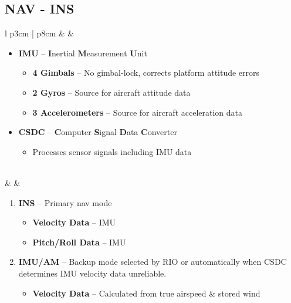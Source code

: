\documentclass[fontHelvetica, widesubsec]{TechCheck}
\begin{document}
	\subsection{NAV - INS}
	\begin{center}
		\begin{longtable}{l p{3cm} | p{8cm}}
			\toprule
			\textbf{\textbullet} &  &
			\begin{minipage}[t]{\linewidth}
				\vspace{-7pt}
				\begin{itemize}
					\item \textbf{IMU} -- \textbf{I}nertial \textbf{M}easurement \textbf{U}nit
					\begin{itemize}
						\item \textbf{4 Gimbals} -- No gimbal-lock, corrects platform attitude errors
						\item \textbf{2 Gyros} -- Source for aircraft attitude data
						\item \textbf{3 Accelerometers} -- Source for aircraft acceleration data
					\end{itemize}
					\item \textbf{CSDC} -- \textbf{C}omputer \textbf{S}ignal \textbf{D}ata \textbf{C}onverter
					\begin{itemize}
						\item Processes sensor signals including IMU data
					\end{itemize}
				\end{itemize}
			\end{minipage} \\
			\midrule
			\textbf{\textbullet} &  &
			\begin{minipage}[t]{\linewidth}
				\vspace{-7pt}
				\begin{enumerate}
					\item \textbf{INS} -- Primary nav mode
					\begin{itemize}
						\item \textbf{Velocity Data} -- IMU
						\item \textbf{Pitch/Roll Data} -- IMU
					\end{itemize}
					\item \textbf{IMU/AM} -- Backup mode selected by RIO or automatically when CSDC determines IMU velocity data unreliable.
					\begin{itemize}
						\item \textbf{Velocity Data} -- Calculated from true airspeed \&  stored wind

\end{itemize}
\end{enumerate}
\end{minipage}
\end{longtable}
\end{center}
\end{document}
